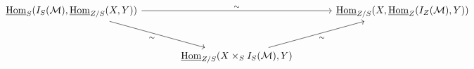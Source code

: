 \[\begin{tikzcd}[column sep=large,row sep=large]
\underline{\operatorname{Hom}}_S(I_S(\mathcal M),\underline{\operatorname{Hom}}_{Z/S}(X,Y)) \arrow[rr,"\sim"] \arrow[dr,"\sim"'] && \underline{\operatorname{Hom}}_{Z/S}(X,\underline{\operatorname{Hom}}_Z(I_Z(\mathcal M),Y))\\
& \underline{\operatorname{Hom}}_{Z/S}(X\times_S I_S(\mathcal M),Y) \arrow[ur,"\sim"']
\end{tikzcd}\]
